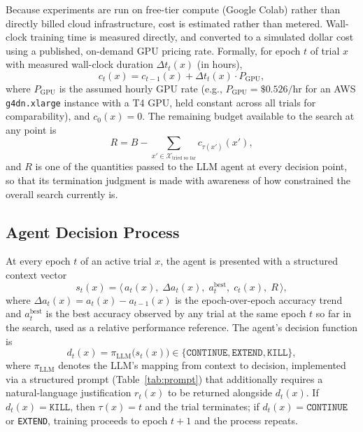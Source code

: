 \documentclass[11pt]{article}
\begin{document}
Because experiments are run on free-tier compute (Google Colab) rather than directly billed cloud infrastructure, cost is estimated rather than metered. Wall-clock training time is measured directly, and converted to a simulated dollar cost using a published, on-demand GPU pricing rate. Formally, for epoch $t$ of trial $x$ with measured wall-clock duration $\Delta t_{t}(x)$ (in hours),
\begin{equation}
c_t(x) = c_{t-1}(x) + \Delta t_t(x) \cdot P_{\text{GPU}},
\label{eq:cost_epoch}
\end{equation}
where $P_{\text{GPU}}$ is the assumed hourly GPU rate (e.g., $P_{\text{GPU}} = \$0.526/\text{hr}$ for an AWS \texttt{g4dn.xlarge} instance with a T4 GPU, held constant across all trials for comparability), and $c_0(x) = 0$. The remaining budget available to the search at any point is
\begin{equation}
R = B - \sum_{x' \in \mathcal{X}_{\text{tried so far}}} c_{\tau(x')}(x'),
\label{eq:remaining_budget}
\end{equation}
and $R$ is one of the quantities passed to the LLM agent at every decision point, so that its termination judgment is made with awareness of how constrained the overall search currently is.

\subsection{Agent Decision Process}

At every epoch $t$ of an active trial $x$, the agent is presented with a structured context vector
\begin{equation}
s_t(x) = \big\langle\, a_t(x),\; \Delta a_t(x),\; a_t^{\text{best}},\; c_t(x),\; R \,\big\rangle,
\label{eq:state_vector}
\end{equation}
where $\Delta a_t(x) = a_t(x) - a_{t-1}(x)$ is the epoch-over-epoch accuracy trend and $a_t^{\text{best}}$ is the best accuracy observed by any trial at the same epoch $t$ so far in the search, used as a relative performance reference. The agent's decision function is
\begin{equation}
d_t(x) = \pi_{\text{LLM}}\big(s_t(x)\big) \in \{\texttt{CONTINUE}, \texttt{EXTEND}, \texttt{KILL}\},
\label{eq:decision_function}
\end{equation}
where $\pi_{\text{LLM}}$ denotes the LLM's mapping from context to decision, implemented via a structured prompt (Table~\ref{tab:prompt}) that additionally requires a natural-language justification $r_t(x)$ to be returned alongside $d_t(x)$. If $d_t(x) = \texttt{KILL}$, then $\tau(x) = t$ and the trial terminates; if $d_t(x) = \texttt{CONTINUE}$ or \texttt{EXTEND}, training proceeds to epoch $t+1$ and the process repeats.
\end{document}
